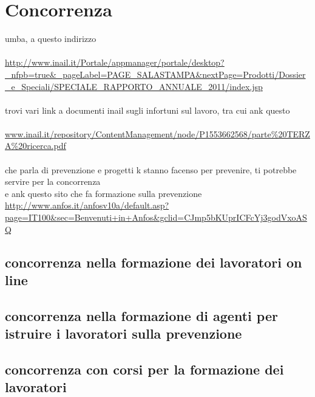 \newpage

\section{Concorrenza}

umba, a questo indirizzo\\\\
\url{http://www.inail.it/Portale/appmanager/portale/desktop?_nfpb=true&_pageLabel=PAGE_SALASTAMPA&nextPage=Prodotti/Dossier_e_Speciali/SPECIALE_RAPPORTO_ANNUALE_2011/index.jsp}\\\\
trovi  vari link a documenti inail sugli infortuni sul lavoro, tra cui ank questo\\\\
\url{www.inail.it/repository/ContentManagement/node/P1553662568/parte\%20TERZA\%20ricerca.pdf}\\\\
che parla di prevenzione e progetti k stanno facenso per prevenire, ti potrebbe servire per la concorrenza\\

e ank questo sito che fa formazione sulla prevenzione\\
\url{http://www.anfos.it/anfosv10a/default.asp?page=IT100&sec=Benvenuti+in+Anfos&gclid=CJmp5bKUprICFcYj3godVxoASQ}\\



\subsection{concorrenza nella formazione dei lavoratori on line}
\subsection{concorrenza nella formazione di agenti per istruire i lavoratori sulla prevenzione}
\subsection{concorrenza con corsi per la formazione dei lavoratori}



